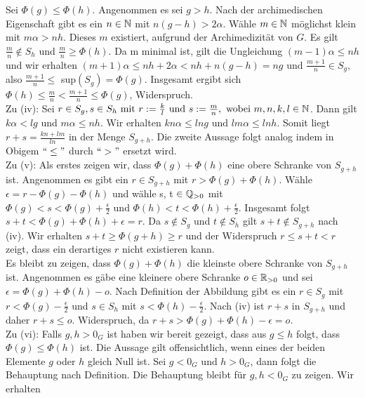 {Sei $\Phi\left(g\right) \le \Phi\left(h\right)$. Angenommen es sei $g > h$. Nach der archimedischen Eigenschaft gibt es ein $ n \in \mathbb{N}$ mit $n\left(g-h\right) > 2\alpha$. Wähle $m \in \mathbb{N}$ möglichst klein mit $m\alpha > nh$. Dieses $m$ existiert, aufgrund der Archimedizität von $G$. Es gilt $\frac{m}{n} \notin S_h$ und $\frac{m}{n} \geq \Phi\left(h\right).$
Da m minimal ist, gilt die Ungleichung $\left(m-1\right)\alpha \le nh$ und wir erhalten $ \left(m+1\right)\alpha \le nh + 2\alpha < nh + n(g-h) = ng$ und $\frac{m+1}{n} \in S_g,$ also $\frac{m+1}{n} \leq$ sup$\left(S_g\right) = \Phi\left(g\right)$. Insgesamt ergibt sich $\Phi\left(h\right) \le \frac{m}{n} < \frac{m + 1}{n} \le \Phi\left(g\right)$, Widerspruch.\\
%
%
%
%
%
%
Zu (iv): Sei $r \in S_g, s \in S_h \text{ mit } r := \frac{k}{l} \text{ und } s:= \frac{m}{n}, \text{ wobei } m, n ,k, l \in \mathbb{N}$. Dann gilt $k\alpha < lg $ und $ m\alpha \le nh$. Wir erhalten $kn\alpha \le lng \text{ und } lm\alpha \le lnh.$ Somit liegt $r+s = \frac{kn+lm}{ln}$ in der Menge $S_{g+h}.$ Die zweite Aussage folgt analog indem in Obigem $``\le "$ durch $``> "$ ersetzt wird.\\
%
%
%
%
%
%
Zu (v): Als erstes zeigen wir, dass $\Phi\left(g\right)+\Phi\left(h\right)$ eine obere Schranke von $S_{g+h}$ ist. Angenommen es gibt ein $r\in S_{g+h}$ mit $r > \Phi\left(g\right)+\Phi\left(h\right)$. Wähle $\epsilon = r - \Phi\left(g\right) - \Phi\left(h\right)$ und wähle s, t $\in \mathbb{Q}_{>0}$ mit $\Phi(g) < s < \Phi(g) + \frac{\epsilon}{2} \text{ und } \Phi\left(h\right) < t < \Phi\left(h\right) +\frac{\epsilon}{2}$. Insgesamt folgt $s + t < \Phi\left(g\right) + \Phi\left(h\right) + \epsilon = r$. Da $s \notin S_g$ und $t \notin S_h$ gilt $s+t \notin S_{g+h}$ nach (iv). Wir erhalten $s+ t \geq \Phi\left(g+h\right) \geq r$ und der Widerspruch $ r \le s+t < r$ zeigt, dass ein derartiges $r$ nicht existieren kann.\\
Es bleibt zu zeigen, dass $\Phi\left(g\right)+\Phi\left(h\right)$ die kleinste obere Schranke von $S_{g+h}$ ist. Angenommen es gäbe eine kleinere obere Schranke $ o \in \mathbb{R}_{>0}$ und sei $\epsilon = \Phi(g) + \Phi(h) - o$. Nach Definition der Abbildung gibt es ein $r\in S_g$ mit $r < \Phi(g) - \frac{\epsilon}{2}$ und $ s \in S_h$ mit $s < \Phi(h) - \frac{\epsilon}{2}.$ Nach (iv) ist $r+s$ in $S_{g+h} $ und daher $ r +s \le o$. Widerspruch, da $r+s >\Phi(g) + \Phi(h) - \epsilon = o$.\\
%
%
%
%
%
Zu (vi): Falls $g, h > 0_{G}$ ist haben wir bereit gezeigt, dass aus $g\le h$ folgt, dass $\Phi(g) \leq \Phi(h)$ ist. Die Aussage gilt offensichtlich, wenn eines der beiden Elemente $g$ oder $h$ gleich Null ist. Sei $g < 0_G \text{ und } h > 0_G$, dann folgt die Behauptung nach Definition. Die Behauptung bleibt für $g, h < 0_G$ zu zeigen. Wir erhalten
}
